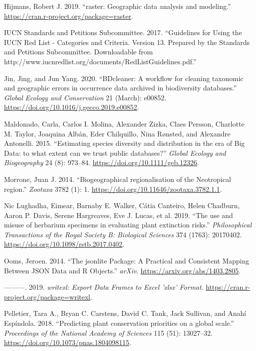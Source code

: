 \documentclass[fleqn,10pt,lineno]{wlpeerj} %
\begin{document}
\leavevmode\hypertarget{ref-Hijmans2019}{}%
Hijmans, Robert J. 2019. ``raster: Geographic data analysis and modeling.'' \url{https://cran.r-project.org/package=raster}.

\leavevmode\hypertarget{ref-IUCN2017}{}%
IUCN Standards and Petitions Subcommittee. 2017. ``Guidelines for Using the IUCN Red List - Categories and Criteria. Version 13. Prepared by the Standards and Petitions Subcommittee. Downloadable from http://www.iucnredlist.org/documents/RedListGuidelines.pdf.''

\leavevmode\hypertarget{ref-Jin2020}{}%
Jin, Jing, and Jun Yang. 2020. ``BDcleaner: A workflow for cleaning taxonomic and geographic errors in occurrence data archived in biodiversity databases.'' \emph{Global Ecology and Conservation} 21 (March): e00852. \url{https://doi.org/10.1016/j.gecco.2019.e00852}.

\leavevmode\hypertarget{ref-Maldonado2015}{}%
Maldonado, Carla, Carlos I. Molina, Alexander Zizka, Claes Persson, Charlotte M. Taylor, Joaquina Albán, Eder Chilquillo, Nina Rønsted, and Alexandre Antonelli. 2015. ``Estimating species diversity and distribution in the era of Big Data: to what extent can we trust public databases?'' \emph{Global Ecology and Biogeography} 24 (8): 973--84. \url{https://doi.org/10.1111/geb.12326}.

\leavevmode\hypertarget{ref-Morrone2014}{}%
Morrone, Juan J. 2014. ``Biogeographical regionalisation of the Neotropical region.'' \emph{Zootaxa} 3782 (1): 1. \url{https://doi.org/10.11646/zootaxa.3782.1.1}.

\leavevmode\hypertarget{ref-NicLughadha2019}{}%
Nic Lughadha, Eimear, Barnaby E. Walker, Cátia Canteiro, Helen Chadburn, Aaron P. Davis, Serene Hargreaves, Eve J. Lucas, et al. 2019. ``The use and misuse of herbarium specimens in evaluating plant extinction risks.'' \emph{Philosophical Transactions of the Royal Society B: Biological Sciences} 374 (1763): 20170402. \url{https://doi.org/10.1098/rstb.2017.0402}.

\leavevmode\hypertarget{ref-Ooms2014}{}%
Ooms, Jeroen. 2014. ``The jsonlite Package: A Practical and Consistent Mapping Between JSON Data and R Objects.'' \emph{arXiv}. \url{https://arxiv.org/abs/1403.2805}.

\leavevmode\hypertarget{ref-Ooms2019}{}%
---------. 2019. \emph{writexl: Export Data Frames to Excel 'xlsx' Format}. \url{https://cran.r-project.org/package=writexl}.

\leavevmode\hypertarget{ref-Pelletier2018}{}%
Pelletier, Tara A., Bryan C. Carstens, David C. Tank, Jack Sullivan, and Anahí Espíndola. 2018. ``Predicting plant conservation priorities on a global scale.'' \emph{Proceedings of the National Academy of Sciences} 115 (51): 13027--32. \url{https://doi.org/10.1073/pnas.1804098115}.
\end{document}
